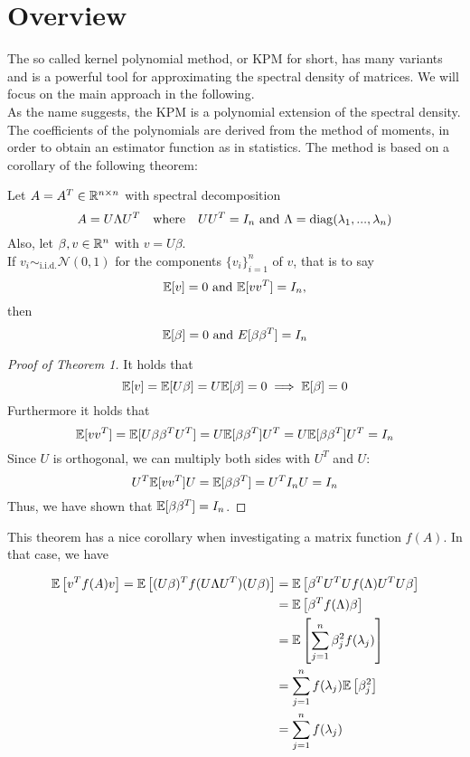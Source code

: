 \section{Overview}
The so called kernel polynomial method, or KPM for short,
has many variants and is a powerful tool for approximating the spectral density of matrices.
We will focus on the main approach in the following.\\
As the name suggests, the KPM is a polynomial extension of the spectral density.
The coefficients of the polynomials are derived from the method of moments,
in order to obtain an estimator function as in statistics.
The method is based on a corollary of the following theorem:


\begin{theorem}
    Let $A = A^T \in \mathbb{R}^{n \times n}$ with spectral decomposition
    \[
    A = U \Lambda U^T \quad \text{where} \quad UU^T = I_n \text{ and } \Lambda = \operatorname{diag}(\lambda_1, ..., \lambda_n)
    \] 
    Also, let $\beta, v \in \mathbb{R}^n$ with $v = U\beta$.\\
    If $v_i \sim_\text{i.i.d.} \mathcal{N}(0, 1)$ for the components $\{v_i\}_{i = 1}^n$ of $v$, that is to say
    \begin{equation} \label{eq:normalverteiltervektor}
        \mathbb{E}[v] = 0 \text{ and } \mathbb{E}[vv^T] = I_n \text{,}
    \end{equation}
    then
    \[
    \mathbb{E}[\beta] = 0 \text{ and } E[\beta \beta^T] = I_n
    \]
\end{theorem}


\begin{proof}[Proof of Theorem 1]
    It holds that
    \[
    \mathbb{E}[v] = \mathbb{E}[U\beta] = U\mathbb{E}[\beta] = 0 \implies \mathbb{E}[\beta] = 0
    \]
    Furthermore it holds that
    \[
    \mathbb{E}[vv^T] = \mathbb{E}[U\beta \beta^TU^T] = U \mathbb{E}[\beta \beta^T]U^T = U \mathbb{E}[\beta \beta^T]U^T = I_n
    \]
    Since $U$ is orthogonal, we can multiply both sides with $U^T$ and $U$:
    \[
    U^T \mathbb{E}[vv^T] U = \mathbb{E}[\beta \beta^T] = U^T I_n U = I_n
    \]
    Thus, we have shown that $\mathbb{E}[\beta \beta^T] = I_n$.
\end{proof}

\vspace{0.5 cm}
This theorem has a nice corollary when investigating a matrix function $f(A)$.
In that case, we have

\begin{align*}
    \mathbb{E}\left[v^Tf(A)v\right] = \mathbb{E}\left[(U\beta)^Tf(U\Lambda U^T)(U\beta)\right] & = \mathbb{E}\left[\beta^TU^TUf(\Lambda)U^TU\beta\right]\\
        & = \mathbb{E}\left[\beta^Tf(\Lambda)\beta\right]\\
        & = \mathbb{E}\left[\sum_{j = 1}^n \beta_j^2 f(\lambda_j) \right]\\
        & = \sum_{j = 1}^n f(\lambda_j) \mathbb{E}\left[ \beta_j^2 \right]\\
        & = \sum_{j = 1}^n f(\lambda_j)
\end{align*}

